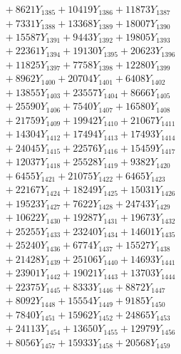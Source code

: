 \documentclass[a4paper,10pt]{article}
\begin{document}
{\begin{align}
&\;  + 8621 Y_{1385} + 10419 Y_{1386} + 11873 Y_{1387} \\[0.3ex]
&\;  + 7331 Y_{1388} + 13368 Y_{1389} + 18007 Y_{1390} \\[0.3ex]
&\;  + 15587 Y_{1391} + 9443 Y_{1392} + 19805 Y_{1393} \\[0.3ex]
&\;  + 22361 Y_{1394} + 19130 Y_{1395} + 20623 Y_{1396} \\[0.3ex]
&\;  + 11825 Y_{1397} + 7758 Y_{1398} + 12280 Y_{1399} \\[0.3ex]
&\;  + 8962 Y_{1400} + 20704 Y_{1401} + 6408 Y_{1402} \\[0.3ex]
&\;  + 13855 Y_{1403} + 23557 Y_{1404} + 8666 Y_{1405} \\[0.3ex]
&\;  + 25590 Y_{1406} + 7540 Y_{1407} + 16580 Y_{1408} \\[0.5ex]\allowbreak
&\;  + 21759 Y_{1409} + 19942 Y_{1410} + 21067 Y_{1411} \\[0.3ex]
&\;  + 14304 Y_{1412} + 17494 Y_{1413} + 17493 Y_{1414} \\[0.3ex]
&\;  + 24045 Y_{1415} + 22576 Y_{1416} + 15459 Y_{1417} \\[0.3ex]
&\;  + 12037 Y_{1418} + 25528 Y_{1419} + 9382 Y_{1420} \\[0.3ex]
&\;  + 6455 Y_{1421} + 21075 Y_{1422} + 6465 Y_{1423} \\[0.3ex]
&\;  + 22167 Y_{1424} + 18249 Y_{1425} + 15031 Y_{1426} \\[0.3ex]
&\;  + 19523 Y_{1427} + 7622 Y_{1428} + 24743 Y_{1429} \\[0.3ex]
&\;  + 10622 Y_{1430} + 19287 Y_{1431} + 19673 Y_{1432} \\[0.3ex]
&\;  + 25255 Y_{1433} + 23240 Y_{1434} + 14601 Y_{1435} \\[0.3ex]
&\;  + 25240 Y_{1436} + 6774 Y_{1437} + 15527 Y_{1438} \\[0.5ex]\allowbreak
&\;  + 21428 Y_{1439} + 25106 Y_{1440} + 14693 Y_{1441} \\[0.3ex]
&\;  + 23901 Y_{1442} + 19021 Y_{1443} + 13703 Y_{1444} \\[0.3ex]
&\;  + 22375 Y_{1445} + 8333 Y_{1446} + 8872 Y_{1447} \\[0.3ex]
&\;  + 8092 Y_{1448} + 15554 Y_{1449} + 9185 Y_{1450} \\[0.3ex]
&\;  + 7840 Y_{1451} + 15962 Y_{1452} + 24865 Y_{1453} \\[0.3ex]
&\;  + 24113 Y_{1454} + 13650 Y_{1455} + 12979 Y_{1456} \\[0.3ex]
&\;  + 8056 Y_{1457} + 15933 Y_{1458} + 20568 Y_{1459} \\[0.3ex]

\end{align}}
\end{document}
